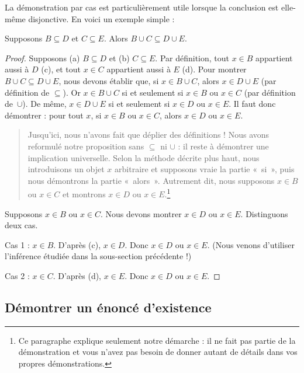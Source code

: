 \documentclass[../../../include/open-logic-section]{subfiles}
\begin{document}
La démonstration par cas est particulièrement utile
lorsque la conclusion est elle-même disjonctive.
En voici un exemple simple :

\begin{prop}
Supposons $B \subseteq D$ et $C \subseteq E$.
Alors $B \cup C \subseteq D \cup E$.
\end{prop}

\begin{proof}
  Supposons (a) $B \subseteq D$ et (b) $C \subseteq E$.
  Par définition, tout $x \in B$ appartient aussi à $D$
  (c), et tout $x \in C$ appartient aussi à $E$ (d).
  Pour montrer $B \cup C \subseteq D \cup E$, nous devons
  établir que, si $x \in B \cup C$, alors
  $x \in D \cup E$ (par définition de $\subseteq$).
  Or $x \in B \cup C$ si et seulement si $x \in B$
  ou $x \in C$ (par définition de~$\cup$).
  De même, $x \in D \cup E$ si et seulement si
  $x \in D$ ou $x \in E$. Il faut donc démontrer :
  pour tout $x$, si $x \in B$ ou $x \in C$,
  alors $x \in D$ ou $x \in E$.

  \begin{quote}
  Jusqu'ici, nous n'avons fait que déplier des définitions !{}
  Nous avons reformulé notre proposition sans
  $\subseteq$ ni $\cup$ : il reste à démontrer
  une implication universelle. Selon la méthode décrite
  plus haut, nous introduisons un objet $x$ arbitraire
  et supposons vraie la partie «~si~», puis nous
  démontrons la partie «~alors~». Autrement dit,
  nous supposons $x \in B$ ou $x \in C$ et montrons
  $x \in D$ ou $x \in E$.\footnote{
    Ce paragraphe explique seulement notre démarche :
    il ne fait pas partie de la démonstration et vous
    n'avez pas besoin de donner autant de détails dans
    vos propres démonstrations.}
  \end{quote}

  Supposons $x \in B$ ou $x \in C$. Nous devons
  montrer $x \in D$ ou $x \in E$. Distinguons
  deux cas.

  Cas 1 : $x \in B$. D'après (c), $x \in D$.
  Donc $x \in D$ ou $x \in E$. (Nous venons
  d'utiliser l'inférence étudiée dans la
  sous-section précédente !)

  Cas 2 : $x \in C$. D'après (d), $x \in E$.
  Donc $x \in D$ ou $x \in E$.
\end{proof}

\subsection{Démontrer un énoncé d'existence}
\end{document}

